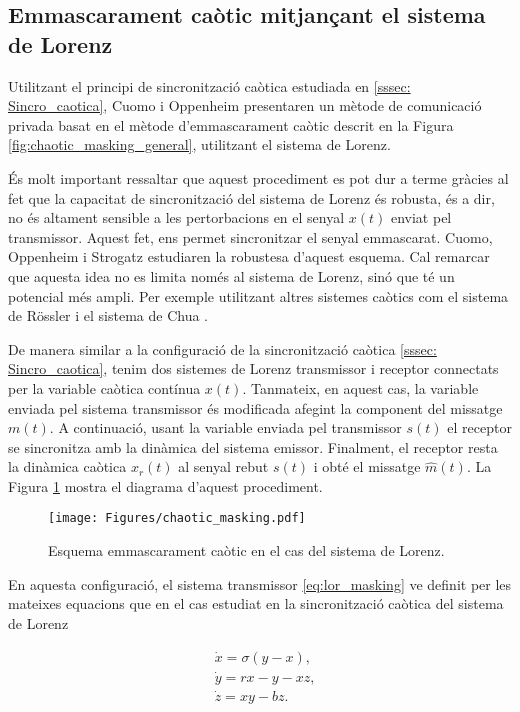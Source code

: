 \documentclass[11pt,a4paper,openright,oneside]{article}
\numberwithin{equation}{section}
\theoremstyle{definition}
\begin{document}
\subsection{Emmascarament caòtic mitjançant el sistema de Lorenz} \label{sssec:lorenz_masking}

Utilitzant el principi de sincronització caòtica estudiada en  \ref{sssec: Sincro_caotica}, Cuomo i Oppenheim \cite{Cuomo} presentaren un mètode de comunicació privada basat en el mètode d'emmascarament caòtic descrit en la Figura \ref{fig:chaotic_masking_general}, utilitzant el sistema de Lorenz.

És molt important ressaltar que aquest procediment es pot dur a terme gràcies al fet que la capacitat de sincronització del sistema de Lorenz és robusta, és a dir, no és altament sensible a les pertorbacions en el senyal $x(t)$ enviat pel transmissor. Aquest fet, ens permet sincronitzar el senyal emmascarat. Cuomo, Oppenheim i Strogatz \cite{Robustesa} estudiaren la robustesa d'aquest esquema. Cal remarcar que aquesta idea no es limita només al sistema de Lorenz, sinó que té un potencial més ampli. Per exemple utilitzant altres sistemes caòtics com el sistema de Rössler \cite{Rossler} i el sistema de Chua \cite{Chua}.

De manera similar a la configuració de la sincronització caòtica \ref{sssec: Sincro_caotica}, tenim dos sistemes de Lorenz transmissor i receptor connectats per la variable caòtica contínua $x(t)$. Tanmateix, en aquest cas, la variable enviada pel sistema transmissor és modificada afegint la component del missatge $m(t)$. A continuació, usant la variable enviada pel transmissor $s(t)$ el receptor se sincronitza amb la dinàmica del sistema emissor. Finalment, el receptor resta la dinàmica caòtica $x_r(t)$ al senyal rebut $s(t)$ i obté el missatge $\hat{m}(t)$. La Figura \ref{fig:chaotic_masking} mostra el diagrama d'aquest procediment.

\begin{figure}[htpb]
    \centering
    \texttt{[image: Figures/chaotic\_masking.pdf]}
    \caption{Esquema emmascarament caòtic en el cas del sistema de Lorenz.}
    \label{fig:chaotic_masking}
\end{figure}

En aquesta configuració, el sistema transmissor \eqref{eq:lor_masking} ve definit per les mateixes equacions que en el cas estudiat en la sincronització caòtica del sistema de Lorenz 

\begin{equation}\begin{aligned}\label{eq:lor_masking}
    &\dot{x}=\sigma(y-x), \\
    &\dot{y}=rx-y-xz, \\
    &\dot{z}=xy-bz.
\end{aligned}\end{equation} 
\end{document}
